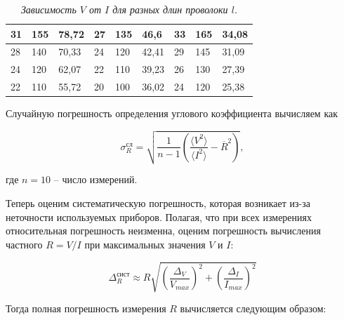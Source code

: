 \documentclass[a4paper,12pt]{article} %
\begin{document}
\begin{table}[h!]
\begin{tabular}{|lll|lll|lll|}
\multicolumn{1}{|l|}{31}     & \multicolumn{1}{l|}{155}   & 78,72                      & \multicolumn{1}{l|}{27}     & \multicolumn{1}{l|}{135}   & 46,6                       & \multicolumn{1}{l|}{33}     & \multicolumn{1}{l|}{165}   & 34,08                      \\ \hline
\multicolumn{1}{|l|}{28}     & \multicolumn{1}{l|}{140}   & 70,33                      & \multicolumn{1}{l|}{24}     & \multicolumn{1}{l|}{120}   & 42,41                      & \multicolumn{1}{l|}{29}     & \multicolumn{1}{l|}{145}   & 31,09                      \\ \hline
\multicolumn{1}{|l|}{24}     & \multicolumn{1}{l|}{120}   & 62,07                      & \multicolumn{1}{l|}{22}     & \multicolumn{1}{l|}{110}   & 39,23                      & \multicolumn{1}{l|}{26}     & \multicolumn{1}{l|}{130}   & 27,39                      \\ \hline
\multicolumn{1}{|l|}{22}     & \multicolumn{1}{l|}{110}   & 55,72                      & \multicolumn{1}{l|}{20}     & \multicolumn{1}{l|}{100}   & 36,02                      & \multicolumn{1}{l|}{24}     & \multicolumn{1}{l|}{120}   & 25,38                      \\ \hline
\end{tabular}
\caption{\textit{Зависимость $ V $ от $ I $ для разных длин проволоки $ l $.}}\label{tab:VotI}
\end{table}

Случайную погрешность определения углового коэффициента вычисляем как

\begin{equation}
\sigma^\text{сл}_R = \sqrt{\frac{1}{n-1}\left( \frac{\langle V^2\rangle}{\langle I^2 \rangle} - \overline{R}^2 \right) },
\end{equation}

где $ n = 10 $ -- число измерений.

Теперь оценим систематическую погрешность, которая возникает из-за неточности используемых приборов. Полагая, что при всех измерениях относительная погрешность неизменна, оценим погрешность вычисления частного $ R = V / I $ при максимальных значения $ V $ и $ I $:

\begin{equation}
\Delta^\text{сист}_R \approx R\sqrt{\left( \frac{\Delta_V}{V_{max}} \right)^2 + \left( \frac{\Delta_I}{I_{max}} \right)^2  }
\end{equation}

Тогда полная погрешность измерения $ R $ вычисляется следующим образом:
\end{document}
